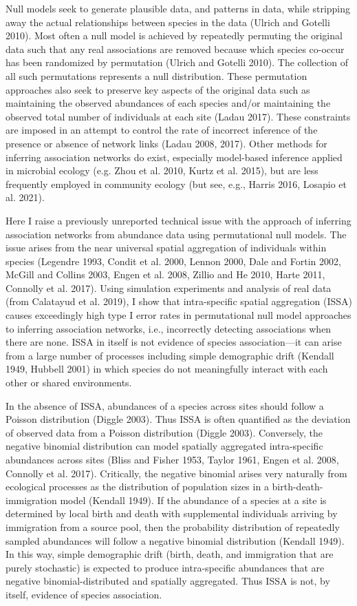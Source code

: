 \documentclass[
  letterpaper,
  DIV=11,
  numbers=noendperiod]{scrartcl}
\begin{document}
Null models seek to generate plausible data, and patterns in data, while
stripping away the actual relationships between species in the data
(Ulrich and Gotelli 2010). Most often a null model is achieved by
repeatedly permuting the original data such that any real associations
are removed because which species co-occur has been randomized by
permutation (Ulrich and Gotelli 2010). The collection of all such
permutations represents a null distribution. These permutation
approaches also seek to preserve key aspects of the original data such
as maintaining the observed abundances of each species and/or
maintaining the observed total number of individuals at each site (Ladau
2017). These constraints are imposed in an attempt to control the rate
of incorrect inference of the presence or absence of network links
(Ladau 2008, 2017). Other methods for inferring association networks do
exist, especially model-based inference applied in microbial ecology
(e.g. Zhou et al. 2010, Kurtz et al. 2015), but are less frequently
employed in community ecology (but see, e.g., Harris 2016, Losapio et
al. 2021).

Here I raise a previously unreported technical issue with the approach
of inferring association networks from abundance data using
permutational null models. The issue arises from the near universal
spatial aggregation of individuals within species (Legendre 1993, Condit
et al. 2000, Lennon 2000, Dale and Fortin 2002, McGill and Collins 2003,
Engen et al. 2008, Zillio and He 2010, Harte 2011, Connolly et al.
2017). Using simulation experiments and analysis of real data (from
Calatayud et al. 2019), I show that intra-specific spatial aggregation
(ISSA) causes exceedingly high type I error rates in permutational null
model approaches to inferring association networks, i.e., incorrectly
detecting associations when there are none. ISSA in itself is not
evidence of species association---it can arise from a large number of
processes including simple demographic drift (Kendall 1949, Hubbell
2001) in which species do not meaningfully interact with each other or
shared environments.

In the absence of ISSA, abundances of a species across sites should
follow a Poisson distribution (Diggle 2003). Thus ISSA is often
quantified as the deviation of observed data from a Poisson distribution
(Diggle 2003). Conversely, the negative binomial distribution can model
spatially aggregated intra-specific abundances across sites (Bliss and
Fisher 1953, Taylor 1961, Engen et al. 2008, Connolly et al. 2017).
Critically, the negative binomial arises very naturally from ecological
processes as the distribution of population sizes in a
birth-death-immigration model (Kendall 1949). If the abundance of a
species at a site is determined by local birth and death with
supplemental individuals arriving by immigration from a source pool,
then the probability distribution of repeatedly sampled abundances will
follow a negative binomial distribution (Kendall 1949). In this way,
simple demographic drift (birth, death, and immigration that are purely
stochastic) is expected to produce intra-specific abundances that are
negative binomial-distributed and spatially aggregated. Thus ISSA is
not, by itself, evidence of species association.
\end{document}
